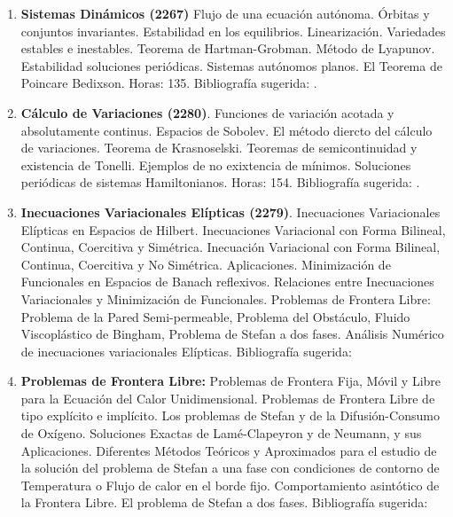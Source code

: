 \documentclass[a4paper, 12pt]{article}
\begin{document}
\begin{description}
\begin{enumerate}
\item \textbf{Sistemas Dinámicos (2267)}  Flujo de una ecuación autónoma. Órbitas y conjuntos invariantes. Estabilidad en los equilibrios.   Linearización. Variedades estables e inestables. Teorema de Hartman-Grobman. Método de
Lyapunov. Estabilidad soluciones periódicas. Sistemas autónomos planos. El Teorema de Poincare Bedixson. Horas: 135. Bibliografía  sugerida: \cite{betounes2009differential,teschl2012ordinary}.

\item\textbf{ Cálculo de Variaciones (2280)}. Funciones de variación acotada y absolutamente continus. Espacios de Sobolev. El método diercto del cálculo de variaciones. Teorema de Krasnoselski. Teoremas de semicontinuidad y existencia de Tonelli. Ejemplos de no exixtencia de mínimos. Soluciones periódicas de sistemas Hamiltonianos. Horas: 154. Bibliografía  sugerida: \cite{mawhin2013critical,buttazzo1998one}.

\item\textbf{Inecuaciones Variacionales Elípticas (2279)}. Inecuaciones
Variacionales E\-lípticas en Espacios de Hilbert. Inecuaciones
Variacional con Forma Bilineal, Continua, Coercitiva y Simétrica.
Inecuación Variacional con Forma Bilineal, Continua, Coercitiva y
No Simétrica. Aplicaciones. Minimización de Funcionales en
Espacios de Banach reflexivos. Relaciones entre Inecuaciones
Variacionales y Minimización de Funciona\-les. Problemas de
Frontera Libre: Problema de la Pared Semi-permea\-ble, Problema
del Obstáculo, Fluido Viscoplástico de Bingham, Problema de Stefan
a dos fases. Análisis Numérico de inecuaciones variacionales
Elípticas. Bibliografía sugerida: \cite{ekel, kinder}


 


\item\textbf{Problemas de Frontera Libre:} Problemas de Frontera Fija, Móvil
y Libre para la Ecuación del Calor Unidimensional. Problemas de
Frontera Libre de tipo explícito e implícito. Los problemas de
Stefan y de la Difusión-Consumo de Oxígeno. Soluciones Exactas de
Lamé-Clapeyron y de Neumann, y sus Aplicaciones. Diferentes
Métodos Teóricos y Aproximados para el estudio de la solución del
problema de Stefan a una fase con condiciones de contorno de
Temperatura o Flujo de calor en el borde fijo. Comportamiento
asintótico de la Frontera Libre. El problema de Stefan a dos
fases. Bibliografía  sugerida: \cite{hill,tarzia}




\end{enumerate}
\end{description}
\end{document}
